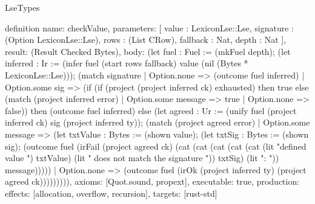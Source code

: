 \begin{lexlean}{LseTypes}
\begin{semanticmodule}
definition{
  name: checkValue,
  parameters: [
    value : LexiconLse::Lse,
    signature : (Option LexiconLse::Lse),
    rows : (List CRow),
    fallback : Nat,
    depth : Nat
  ],
  result: (Result Checked Bytes),
  body: (let fuel : Fuel := (mkFuel depth); (let inferred : Ir := (infer fuel (start rows fallback) value (nil (Bytes * LexiconLse::Lse))); (match signature
    | Option.none => (outcome fuel inferred)
    | Option.some sig => (if (if (project (project inferred ck) exhausted) then true else (match (project inferred error)
      | Option.some message => true
      | Option.none => false)) then (outcome fuel inferred) else (let agreed : Ur := (unify fuel (project inferred ck) sig (project inferred ty)); (match (project agreed error)
      | Option.some message => (let txtValue : Bytes := (shown value); (let txtSig : Bytes := (shown sig); (outcome fuel (irFail (project agreed ck) (cat (cat (cat (cat (cat (lit "defined value ") txtValue) (lit " does not match the signature ")) txtSig) (lit ": ")) message)))))
      | Option.none => (outcome fuel (irOk (project inferred ty) (project agreed ck))))))))),
  axioms: [Quot.sound, propext],
  executable: true,
  production: {effects: [allocation, overflow, recursion], targets: [rust-std]}
}
\end{semanticmodule}
\end{lexlean}
